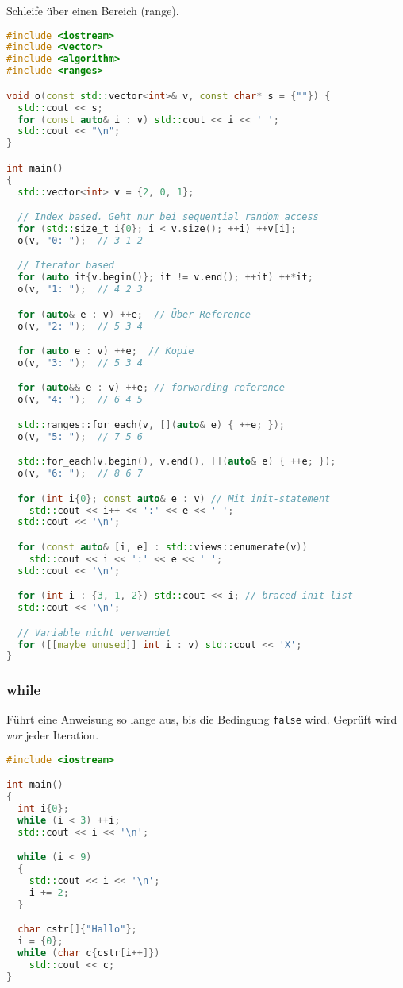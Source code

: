 \documentclass[10pt,twocolumn]{scrartcl}
\begin{document}
Schleife über einen Bereich (range).

\begin{lstlisting}[language=C++]
#include <iostream>
#include <vector>
#include <algorithm>
#include <ranges>

void o(const std::vector<int>& v, const char* s = {""}) {
  std::cout << s;
  for (const auto& i : v) std::cout << i << ' ';
  std::cout << "\n";
}

int main()
{
  std::vector<int> v = {2, 0, 1};

  // Index based. Geht nur bei sequential random access
  for (std::size_t i{0}; i < v.size(); ++i) ++v[i];
  o(v, "0: ");  // 3 1 2

  // Iterator based
  for (auto it{v.begin()}; it != v.end(); ++it) ++*it;
  o(v, "1: ");  // 4 2 3

  for (auto& e : v) ++e;  // Über Reference
  o(v, "2: ");  // 5 3 4

  for (auto e : v) ++e;  // Kopie
  o(v, "3: ");  // 5 3 4

  for (auto&& e : v) ++e; // forwarding reference
  o(v, "4: ");  // 6 4 5

  std::ranges::for_each(v, [](auto& e) { ++e; });
  o(v, "5: ");  // 7 5 6

  std::for_each(v.begin(), v.end(), [](auto& e) { ++e; });
  o(v, "6: ");  // 8 6 7

  for (int i{0}; const auto& e : v) // Mit init-statement
    std::cout << i++ << ':' << e << ' ';
  std::cout << '\n';

  for (const auto& [i, e] : std::views::enumerate(v))
    std::cout << i << ':' << e << ' ';
  std::cout << '\n';

  for (int i : {3, 1, 2}) std::cout << i; // braced-init-list
  std::cout << '\n';

  // Variable nicht verwendet
  for ([[maybe_unused]] int i : v) std::cout << 'X';
}
\end{lstlisting}

\subsubsection{while}

Führt eine Anweisung so lange aus, bis die Bedingung \lstinline|false| wird.
Geprüft wird \emph{vor} jeder Iteration.

\begin{lstlisting}[language=C++]
#include <iostream>

int main()
{
  int i{0};
  while (i < 3) ++i;
  std::cout << i << '\n';

  while (i < 9)
  {
    std::cout << i << '\n';
    i += 2;
  }

  char cstr[]{"Hallo"};
  i = {0};
  while (char c{cstr[i++]})
    std::cout << c;
}
\end{lstlisting}
\end{document}
